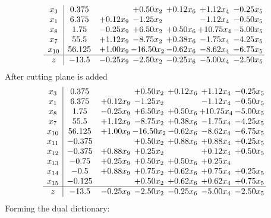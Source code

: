 \documentclass[8pt]{article}
\begin{document}
\[\begin{array}{c| c c@{\hskip 2pt} c@{\hskip 2pt} c@{\hskip 2pt} c@{\hskip 2pt} c@{\hskip 2pt} }
 x_{3}   &  0.375  &   & +  0.50 x_{2} & +  0.12 x_{6} & +  1.12 x_{4} & -0.25 x_{5}\\
 x_{1}   &  6.375 & +  0.12 x_{9} & -1.25 x_{2} &   & -1.12 x_{4} & -0.50 x_{5}\\
 x_{8}   &  1.75 & -0.25 x_{9} & +  6.50 x_{2} & +  0.50 x_{6} & + 10.75 x_{4} & -5.00 x_{5}\\
 x_{7}   &  55.5 & +  1.12 x_{9} & -8.75 x_{2} & +  0.38 x_{6} & -1.75 x_{4} & -4.25 x_{5}\\
 x_{10}   &  56.125 & +  1.00 x_{9} & -16.50 x_{2} & -0.62 x_{6} & -8.62 x_{4} & -6.75 x_{5}\\
\hline
z    &  -13.5 & -0.25 x_{9} & -2.50 x_{2} & -0.25 x_{6} & -5.00 x_{4} & -2.50 x_{5}\\
\end{array}\]
 After cutting plane is added 
\[\begin{array}{c| c c@{\hskip 2pt} c@{\hskip 2pt} c@{\hskip 2pt} c@{\hskip 2pt} c@{\hskip 2pt} }
 x_{3}   &  0.375  &   & +  0.50 x_{2} & +  0.12 x_{6} & +  1.12 x_{4} & -0.25 x_{5}\\
 x_{1}   &  6.375 & +  0.12 x_{9} & -1.25 x_{2} &   & -1.12 x_{4} & -0.50 x_{5}\\
 x_{8}   &  1.75 & -0.25 x_{9} & +  6.50 x_{2} & +  0.50 x_{6} & + 10.75 x_{4} & -5.00 x_{5}\\
 x_{7}   &  55.5 & +  1.12 x_{9} & -8.75 x_{2} & +  0.38 x_{6} & -1.75 x_{4} & -4.25 x_{5}\\
 x_{10}   &  56.125 & +  1.00 x_{9} & -16.50 x_{2} & -0.62 x_{6} & -8.62 x_{4} & -6.75 x_{5}\\
 x_{11}   &  -0.375  &   & +  0.50 x_{2} & +  0.88 x_{6} & +  0.88 x_{4} & +  0.25 x_{5}\\
 x_{12}   &  -0.375 & +  0.88 x_{9} & +  0.25 x_{2} &   & +  0.12 x_{4} & +  0.50 x_{5}\\
 x_{13}   &  -0.75 & +  0.25 x_{9} & +  0.50 x_{2} & +  0.50 x_{6} & +  0.25 x_{4} &   \\
 x_{14}   &  -0.5 & +  0.88 x_{9} & +  0.75 x_{2} & +  0.62 x_{6} & +  0.75 x_{4} & +  0.25 x_{5}\\
 x_{15}   &  -0.125  &   & +  0.50 x_{2} & +  0.62 x_{6} & +  0.62 x_{4} & +  0.75 x_{5}\\
\hline
z    &  -13.5 & -0.25 x_{9} & -2.50 x_{2} & -0.25 x_{6} & -5.00 x_{4} & -2.50 x_{5}\\
\end{array}\]
Forming the dual dictionary:
\end{document}
